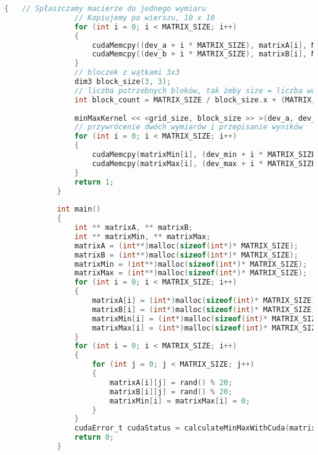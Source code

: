 			\begin{lstlisting}[language=C]
			{	// Spłaszczamy macierze do jednego wymiaru
				// Kopiujemy po wierszu, 10 x 10
				for (int i = 0; i < MATRIX_SIZE; i++)
				{
					cudaMemcpy((dev_a + i * MATRIX_SIZE), matrixA[i], MATRIX_SIZE * sizeof(int), cudaMemcpyHostToDevice);
					cudaMemcpy((dev_b + i * MATRIX_SIZE), matrixB[i], MATRIX_SIZE * sizeof(int), cudaMemcpyHostToDevice);
				}
				// bloczek z wątkami 3x3
				dim3 block_size(3, 3);
				// liczba potrzebnych bloków, tak żeby size = liczba wątków
				int block_count = MATRIX_SIZE / block_size.x + (MATRIX_SIZE % block_size.x == 0 ? 0 : 1);
				
				minMaxKernel << <grid_size, block_size >> >(dev_a, dev_b, dev_min, dev_max);
				// przywrócenie dwóch wymiarów i przepisanie wyników
				for (int i = 0; i < MATRIX_SIZE; i++)
				{
					cudaMemcpy(matrixMin[i], (dev_min + i * MATRIX_SIZE), MATRIX_SIZE * sizeof(int), cudaMemcpyDeviceToHost);
					cudaMemcpy(matrixMax[i], (dev_max + i * MATRIX_SIZE), MATRIX_SIZE * sizeof(int), cudaMemcpyDeviceToHost);
				}
				return 1;
			}
			
			int main()
			{
				int ** matrixA, ** matrixB;
				int ** matrixMin, ** matrixMax;
				matrixA = (int**)malloc(sizeof(int*)* MATRIX_SIZE);
				matrixB = (int**)malloc(sizeof(int*)* MATRIX_SIZE);
				matrixMin = (int**)malloc(sizeof(int*)* MATRIX_SIZE);
				matrixMax = (int**)malloc(sizeof(int*)* MATRIX_SIZE);
				for (int i = 0; i < MATRIX_SIZE; i++)
				{
					matrixA[i] = (int*)malloc(sizeof(int)* MATRIX_SIZE);
					matrixB[i] = (int*)malloc(sizeof(int)* MATRIX_SIZE);
					matrixMin[i] = (int*)malloc(sizeof(int)* MATRIX_SIZE);
					matrixMax[i] = (int*)malloc(sizeof(int)* MATRIX_SIZE);
				}
				for (int i = 0; i < MATRIX_SIZE; i++)
				{
					for (int j = 0; j < MATRIX_SIZE; j++)
					{
						matrixA[i][j] = rand() % 20;
						matrixB[i][j] = rand() % 20;
						matrixMin[i] = matrixMax[i] = 0;
					}
				}
				cudaError_t cudaStatus = calculateMinMaxWithCuda(matrixA, matrixB, matrixMin, matrixMax);
				return 0;
			}
		\end{lstlisting}
		\newpage
